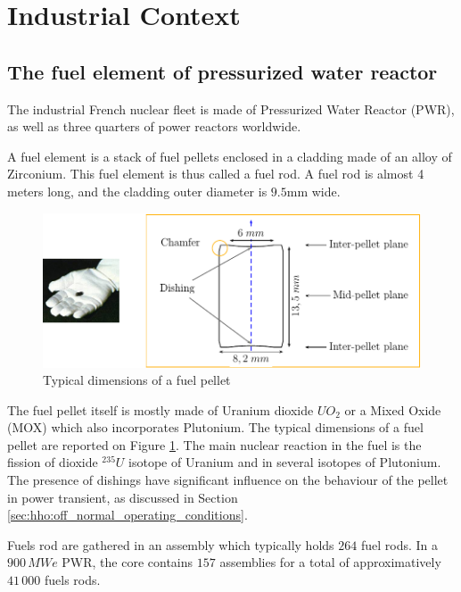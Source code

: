 \section{Industrial Context}

\subsection{The fuel element of pressurized water reactor}

The industrial French nuclear fleet is made of Pressurized Water Reactor
(PWR), as well as three quarters of power reactors worldwide.

A fuel element is a stack of fuel pellets enclosed in a cladding made of
an alloy of Zirconium. This fuel element is thus called a fuel rod. A
fuel rod is almost 4 meters long, and the cladding outer diameter is
$9.5$mm wide.


\begin{figure}[H]
  \centering
  \includegraphics[width=10.cm]{../chapter_00_introduction/figures/FuelPellet.pdf}
  \caption{Typical dimensions of a fuel pellet}
  \label{fig:hho:fuel_pellet}
\end{figure}

The fuel pellet itself is mostly made of Uranium dioxide \(UO_{2}\) or a
Mixed Oxide (MOX) which also incorporates Plutonium. The typical
dimensions of a fuel pellet are reported on Figure \ref{fig:hho:fuel_pellet}.
The main nuclear reaction in the fuel is the fission of dioxide
\(\mbox{}^{235}U\) isotope of Uranium and in several isotopes
of Plutonium. The presence of dishings have significant influence on the
behaviour of the pellet in power transient, as discussed in Section
\ref{sec:hho:off_normal_operating_conditions}.

Fuels rod are gathered in an assembly which typically holds \(264\) fuel
rods. In a \(900\,MWe\) PWR, the core contains \(157\) assemblies for a
total of approximatively \(41\,000\) fuels rods.

